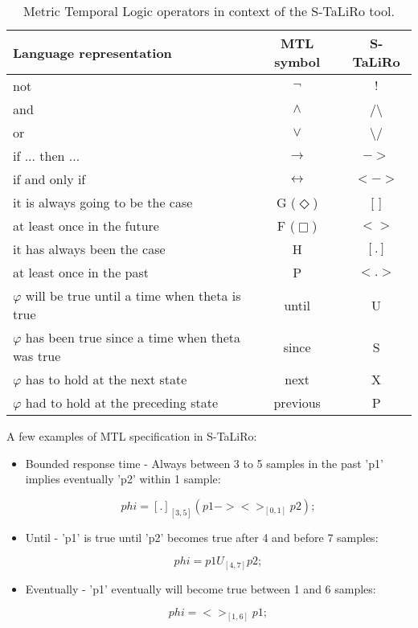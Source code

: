\begin{table}[htb]
\begin{center}
\begin{tabular}{|p{9cm}|c|c|}
    \hline
    Language representation & MTL symbol & S-TaLiRo\\
    \hline
    not & $\neg$ & $!$ \\
    \hline    
    and & $\wedge$ & /\textbackslash \\
    \hline
    or & $\lor$ & \textbackslash/ \\
    \hline
    if ... then ... & $\rightarrow$ & $->$ \\
    \hline
    if and only if & $\leftrightarrow$ & $<->$ \\
    \hline
    it is always going to be the case & G ($\Diamond$) & [ ] \\
    \hline
    at least once in the future & F ($\Box$) & $< >$ \\
    \hline
    it has always been the case & H & $[ . ]$ \\
    \hline
    at least once in the past & P & $< . >$ \\
    \hline
    $\varphi$ will be true until a time when theta is true & until & U \\
    \hline
    $\varphi$ has been true since a time when theta was true & since & S \\
    \hline
    $\varphi$ has to hold at the next state & next & X \\
    \hline
    $\varphi$ had to hold at the preceding state & previous & P \\
    \hline
\end{tabular}
\end{center}
\caption{Metric Temporal Logic operators in context of the S-TaLiRo tool.}
\label{tab.MTLsTaLiRo}
\end{table}

A few examples of MTL specification in S-TaLiRo:

\begin{itemize}
    \item Bounded response time - Always between 3 to 5 samples in the past 'p1' implies eventually 'p2' within 1 sample:

\begin{equation}
    phi = [.]_{[3,5]}(p1 -> <>_{[0,1]} p2);
\end{equation}

    \item Until - 'p1' is true until 'p2' becomes true after 4 and before 7 samples:

\begin{equation}
	phi = p1 U_{[4,7]} p2;
\end{equation} 

    \item Eventually - 'p1' eventually will become true between 1 and 6 samples:

\begin{equation}
	phi = <>_{[1,6]} p1;
\end{equation} 

\end{itemize}

